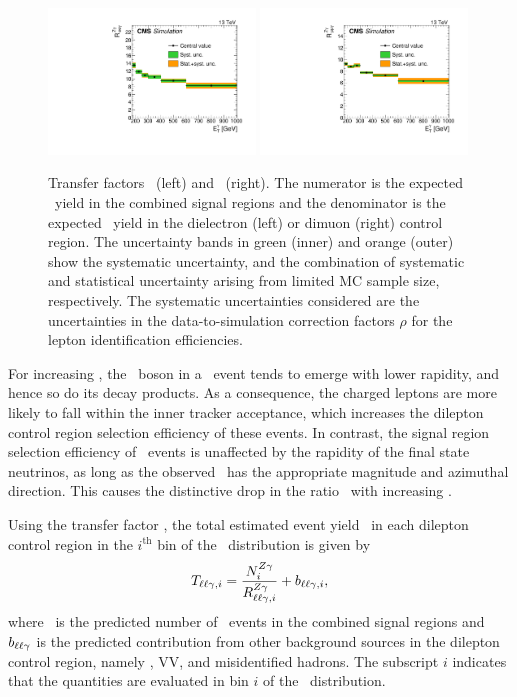 \begin{figure}[htbp]
  \centering
    \includegraphics[width=0.49\textwidth]{Analysis/Figures/RZee.pdf}
    \includegraphics[width=0.49\textwidth]{Analysis/Figures/RZmm.pdf}
    \caption{
      Transfer factors \RZee\ (left) and \RZmm\ (right).
      The numerator is the expected \zinvg\ yield in the combined signal regions and the denominator is the expected \zllg\ yield in the dielectron (left) or dimuon (right) control region.
      The uncertainty bands in green (inner) and orange (outer) show the systematic uncertainty, and the combination of systematic and statistical uncertainty arising from limited MC sample size, respectively. 
      The systematic uncertainties considered are the uncertainties in the data-to-simulation correction factors $\rho$ for the lepton identification efficiencies.
    }
    \label{fig:tf_z}
\end{figure}

For increasing \ETg, the \PZ\ boson in a \zllg\ event tends to emerge with lower rapidity, and hence so do its decay products. 
As a consequence, the charged leptons are more likely to fall within the inner tracker acceptance, which increases the dilepton control region selection efficiency of these events. 
In contrast, the signal region selection efficiency of \zinvg\ events is unaffected by the rapidity of the final state neutrinos, as long as the observed \met\ has the appropriate magnitude and azimuthal direction. 
This causes the distinctive drop in the ratio \RZll\ with increasing \ETg.

Using the transfer factor \RZll, the total estimated event yield \Tll\ in each dilepton control region in the $i^\mathrm{th}$ bin of the \ETg\ distribution is given by
\begin{equation}
  \Tll[,i] = \frac{\NZg[i]}{\RZll[,i]} + b_{\ell\ell\Pgg,i},
\end{equation}
where \NZg\ is the predicted number of \zinvg\ events in the combined signal regions and $b_{\ell\ell\Pgg}$ is the predicted contribution from other background sources in the dilepton control region, namely \ttg, VV\Pgg, and misidentified hadrons. 
The subscript $i$ indicates that the quantities are evaluated in bin $i$ of the \ETg\ distribution.

